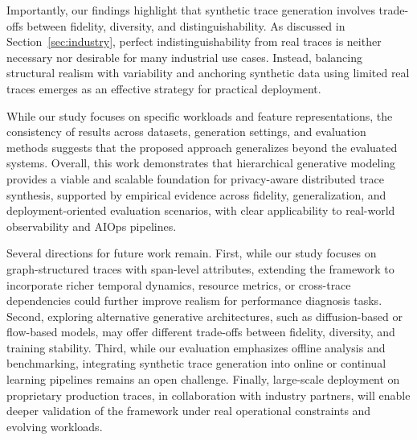 \documentclass[sigconf,review]{acmart}
\begin{document}
Importantly, our findings highlight that synthetic trace generation involves trade-offs between fidelity, diversity, and distinguishability. As discussed in Section~\ref{sec:industry}, perfect indistinguishability from real traces is neither necessary nor desirable for many industrial use cases. Instead, balancing structural realism with variability and anchoring synthetic data using limited real traces emerges as an effective strategy for practical deployment.

While our study focuses on specific workloads and feature representations, the consistency of results across datasets, generation settings, and evaluation methods suggests that the proposed approach generalizes beyond the evaluated systems. Overall, this work demonstrates that hierarchical generative modeling provides a viable and scalable foundation for privacy-aware distributed trace synthesis, supported by empirical evidence across fidelity, generalization, and deployment-oriented evaluation scenarios, with clear applicability to real-world observability and AIOps pipelines.

Several directions for future work remain. First, while our study focuses on graph-structured traces with span-level attributes, extending the framework to incorporate richer temporal dynamics, resource metrics, or cross-trace dependencies could further improve realism for performance diagnosis tasks. Second, exploring alternative generative architectures, such as diffusion-based or flow-based models, may offer different trade-offs between fidelity, diversity, and training stability. Third, while our evaluation emphasizes offline analysis and benchmarking, integrating synthetic trace generation into online or continual learning pipelines remains an open challenge. Finally, large-scale deployment on proprietary production traces, in collaboration with industry partners, will enable deeper validation of the framework under real operational constraints and evolving workloads.


% 
% 

% 

\end{document}
